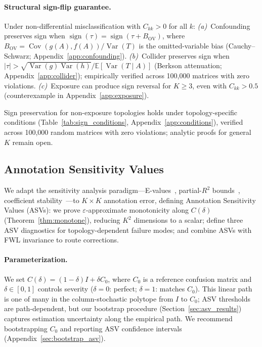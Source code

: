 \paragraph{Structural sign-flip guarantee.}
\begin{proposition}
\label{prop:signflip}
Under non-differential misclassification with $C_{kk} > 0$ for all $k$:
\emph{(a)}~Confounding preserves sign when $\operatorname{sign}(\tau) = \operatorname{sign}(\tau {+} B_{\mathrm{OV}})$, where $B_{\mathrm{OV}} {=} \operatorname{Cov}(g(A),f(A))/\operatorname{Var}(T)$ is the omitted-variable bias (Cauchy--Schwarz; Appendix~\ref{app:confounding}).
\emph{(b)}~Collider preserves sign when $|\tau| > \sqrt{\operatorname{Var}(g)\operatorname{Var}(h)}/\mathbb{E}[\operatorname{Var}(T{\mid}A)]$ (Berkson attenuation; Appendix~\ref{app:collider}); empirically verified across 100{,}000 matrices with zero violations.
\emph{(c)}~Exposure can produce sign reversal for $K {\geq} 3$, even with $C_{kk} {>} 0.5$ (counterexample in Appendix~\ref{app:exposure}).
\end{proposition}

Sign preservation for non-exposure topologies holds under topology-specific conditions (Table~\ref{tab:sign_conditions}, Appendix~\ref{app:conditions}), verified across 100{,}000 random matrices with zero violations; analytic proofs for general $K$ remain open.

\subsection{Annotation Sensitivity Values}
\label{sec:asv}

We adapt the sensitivity analysis paradigm---E-values~\cite{vanderweele_ding2017}, partial-$R^2$ bounds~\cite{cinelli2020making}, coefficient stability~\cite{oster2019}---to $K{\times}K$ annotation error, defining Annotation Sensitivity Values (ASVs): we prove $\varepsilon$-approximate monotonicity along $C(\delta)$ (Theorem~\ref{thm:monotone}), reducing $K^2$ dimensions to a scalar; define three ASV diagnostics for topology-dependent failure modes; and combine ASVs with FWL invariance to route corrections.

\paragraph{Parameterization.}
We set $C(\delta) = (1{-}\delta)I + \delta C_0$, where $C_0$ is a reference confusion matrix and $\delta \in [0,1]$ controls severity ($\delta{=}0$: perfect; $\delta{=}1$: matches $C_0$). This linear path is one of many in the column-stochastic polytope from $I$ to $C_0$; ASV thresholds are path-dependent, but our bootstrap procedure (Section~\ref{sec:asv_results}) captures estimation uncertainty along the empirical path. We recommend bootstrapping $C_0$ and reporting ASV confidence intervals (Appendix~\ref{sec:bootstrap_asv}).
